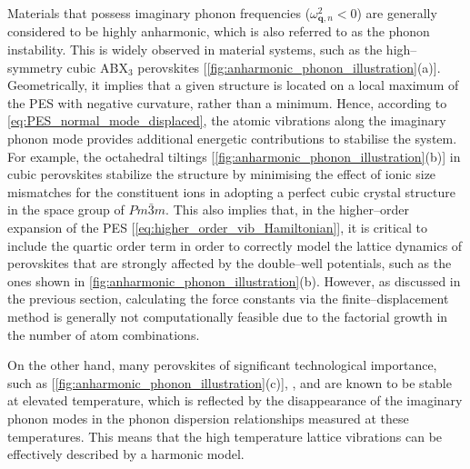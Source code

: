 Materials that possess imaginary phonon frequencies ($\omega_{\bm{q},n}^2<0$) are generally considered to be highly anharmonic, which is also referred to as the phonon instability. This is widely observed in material systems, such as the high--symmetry cubic ABX$_{3}$ perovskites [\cref{fig:anharmonic_phonon_illustration}(a)]. Geometrically, it implies that a given structure is located on a local maximum of the PES with negative curvature, rather than a minimum. Hence, according to \cref{eq:PES_normal_mode_displaced},  the atomic vibrations along the imaginary phonon mode provides additional energetic contributions to stabilise the system. For example, the octahedral tiltings [\cref{fig:anharmonic_phonon_illustration}(b)] in cubic perovskites stabilize the structure by minimising the effect of ionic size mismatches for the constituent ions in adopting a perfect cubic crystal structure in the space group of $Pm\bar{3}m$.\cite{aschauer2014competition} This also implies that, in the higher--order expansion of the PES [\cref{eq:higher_order_vib_Hamiltonian}],   it is critical to include the quartic order term in order to correctly model the lattice dynamics of perovskites that are strongly affected by the double--well potentials, such as the ones shown in  \cref{fig:anharmonic_phonon_illustration}(b). However, as discussed in the previous section, calculating the  force constants via the finite--displacement method is generally not computationally feasible due to the factorial growth in the number of atom combinations.

On the other hand, many perovskites of significant technological importance, such as  [\cref{fig:anharmonic_phonon_illustration}(c)]\cite{stirling1972neutron,cowley1969relationship}, \cite{sun2014dynamic}, and \cite{an2021structural} are known to be stable at elevated temperature, which is reflected by the disappearance of the imaginary phonon modes in the phonon dispersion relationships measured at these temperatures. This means that the high temperature lattice vibrations can be effectively described by a harmonic model.

